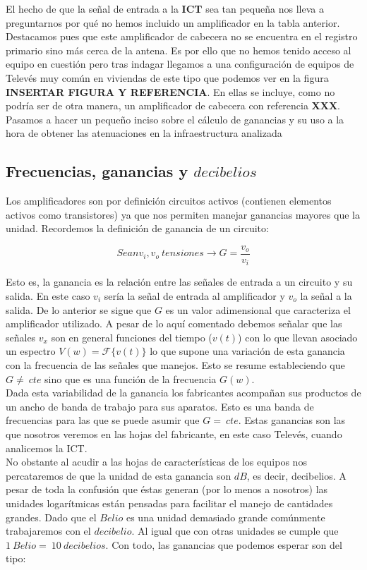\documentclass{article}[12 pt]
\begin{document}
		El hecho de que la señal de entrada a la \textbf{ICT} sea tan pequeña nos lleva a preguntarnos por qué no hemos incluido un amplificador en la tabla anterior. Destacamos pues que este amplificador de cabecera no se encuentra en el registro primario sino más cerca de la antena. Es por ello que no hemos tenido acceso al equipo en cuestión pero tras indagar llegamos a una configuración de equipos de Televés muy común en viviendas de este tipo que podemos ver en la figura \textbf{INSERTAR FIGURA Y REFERENCIA}. En ellas se incluye, como no podría ser de otra manera, un amplificador de cabecera con referencia \textbf{XXX}. Pasamos a hacer un pequeño inciso sobre el cálculo de ganancias y su uso a la hora de obtener las atenuaciones en la infraestructura analizada\\

		\subsection{Frecuencias, ganancias y $decibelios$}
			Los amplificadores son por definición circuitos activos (contienen elementos activos como transistores) ya que nos permiten manejar ganancias mayores que la unidad. Recordemos la definición de ganancia de un circuito:

			$$Sean v_i, v_o\ tensiones \rightarrow G = \frac{v_o}{v_i}$$

			Esto es, la ganancia es la relación entre las señales de entrada a un circuito y su salida. En este caso $v_i$ sería la señal de entrada al amplificador y $v_o$ la señal a la salida. De lo anterior se sigue que $G$ es un valor adimensional que caracteriza el amplificador utilizado. A pesar de lo aquí comentado debemos señalar que las señales $v_x$ son en general funciones del tiempo ($v(t)$) con lo que llevan asociado un espectro $V(w) = \mathcal{F}\{v(t)\}$ lo que supone una variación de esta ganancia con la frecuencia de las señales que manejos. Esto se resume estableciendo que $G \neq\ cte$ sino que es una función de la frecuencia $G(w)$.\\

			Dada esta variabilidad de la ganancia los fabricantes acompañan sus productos de un ancho de banda de trabajo para sus aparatos. Esto es una banda de frecuencias para las que se puede asumir que $G =\ cte$. Estas ganancias son las que nosotros veremos en las hojas del fabricante, en este caso Televés, cuando analicemos la ICT.\\

			No obstante al acudir a las hojas de características de los equipos nos percataremos de que la unidad de esta ganancia son $dB$, es decir, decibelios. A pesar de toda la confusión que éstas generan (por lo menos a nosotros) las unidades logarítmicas están pensadas para facilitar el manejo de cantidades grandes. Dado que el $Belio$ es una unidad demasiado grande comúnmente trabajaremos con el $decibelio$. Al igual que con otras unidades se cumple que $1\ Belio =\ 10\ decibelios$. Con todo, las ganancias que podemos esperar son del tipo:
\end{document}
